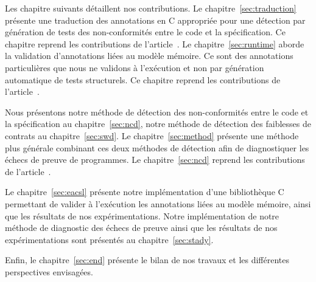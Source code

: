 Les chapitre suivants détaillent nos contributions.
Le chapitre~\ref{sec:traduction} présente une traduction des annotations \acsl
en C appropriée pour une détection par génération de tests des non-conformités
entre le code et la spécification.
Ce chapitre reprend les contributions de l'article~\cite{Petiot/SCAM14}.
Le chapitre~\ref{sec:runtime} aborde la validation d'annotations \acsl liées au
modèle mémoire.
Ce sont des annotations particulières que nous ne validons à l'exécution et non
par génération automatique de tests structurels.
Ce chapitre reprend les contributions de l'article~\cite{Kosmatov/RV13}.

Nous présentons notre méthode de détection des non-conformités entre le code et
la spécification au chapitre~\ref{sec:ncd}, notre méthode de détection des
faiblesses de contrats au chapitre~\ref{sec:swd}.
Le chapitre~\ref{sec:method} présente une méthode plus générale combinant ces
deux méthodes de détection afin de diagnostiquer les échecs de preuve de
programmes.
Le chapitre~\ref{sec:ncd} reprend les contributions de
l'article~\cite{Petiot/TAP14}.

Le chapitre~\ref{sec:eacsl} présente notre implémentation d'une bibliothèque C
permettant de valider à l'exécution les annotations \acsl liées au modèle
mémoire, ainsi que les résultats de nos expérimentations.
Notre implémentation de notre méthode de diagnostic des échecs de preuve ainsi
que les résultats de nos expérimentations sont présentés au
chapitre~\ref{sec:stady}.

Enfin, le chapitre~\ref{sec:end} présente le bilan de nos travaux et les
différentes perspectives envisagées.
